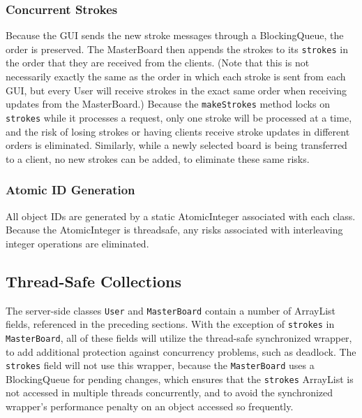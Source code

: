 \subsubsection{Concurrent Strokes}

Because the GUI sends the new stroke messages through a BlockingQueue, the order is preserved. The MasterBoard then appends the strokes to its \texttt{strokes} in the order that they are received from the clients. (Note that this is not necessarily exactly the same as the order in which each stroke is sent from each GUI, but every User will receive strokes in the exact same order when receiving updates from the MasterBoard.) Because the \texttt{makeStrokes} method locks on \texttt{strokes} while it processes a request, only one stroke will be processed at a time, and the risk of losing strokes or having clients receive stroke updates in different orders is eliminated. Similarly, while a newly selected board is being transferred to a client, no new strokes can be added, to eliminate these same risks.

\subsubsection{Atomic ID Generation}

All object IDs are generated by a static AtomicInteger associated with each class. Because the AtomicInteger is threadsafe, any risks associated with interleaving integer operations are eliminated.

\subsection{Thread-Safe Collections}

The server-side classes \texttt{User} and \texttt{MasterBoard} contain a number of ArrayList fields, referenced in the preceding sections. With the exception of \texttt{strokes} in \texttt{MasterBoard}, all of these fields will utilize the thread-safe synchronized wrapper, to add additional protection against concurrency problems, such as deadlock. The \texttt{strokes} field will not use this wrapper, because the \texttt{MasterBoard} uses a BlockingQueue for pending changes, which ensures that the \texttt{strokes} ArrayList is not accessed in multiple threads concurrently, and to avoid the synchronized wrapper's performance penalty on an object accessed so frequently.